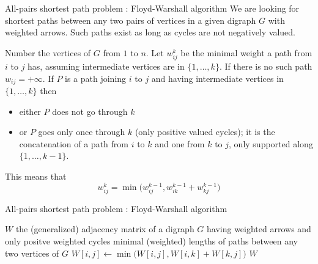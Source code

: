 \documentclass[32pt,aspectratio=169]{beamer}
\begin{document}
\begin{frame}{All-pairs shortest path problem : Floyd-Warshall algorithm}
  We are looking for shortest paths between any two pairs of vertices
  in a given digraph $G$ with weighted arrows. \alert{Such paths exist
    as long as cycles are not negatively valued}.

  \vspace{.5\baselineskip}

  Number the vertices of $G$ from $1$ to $n$. Let $w_{ij}^k$
  be the minimal weight a path from $i$ to $j$ has, assuming
  intermediate vertices are in $\{1, \ldots, k\}$. If there is no such
  path $w_{ij} = +\infty$. If $P$ is a path joining $i$ to $j$ and having
  intermediate vertices in $\{1, \ldots, k \}$ then
  \begin{itemize}
  \item either $P$ does not go through $k$
  \item or $P$ goes only once through $k$ (only positive valued cycles);
    it is the concatenation of a path from $i$ to $k$ and one from $k$
    to $j$, only supported along $\{ 1, \ldots, k-1\}$.
  \end{itemize}
  This means that
  \begin{displaymath}
    w_{ij}^k = \min\Big( w_{ij}^{k-1}, w_{ik}^{k-1} + w_{kj}^{k-1} \Big)
  \end{displaymath}
\end{frame}

\begin{frame}{All-pairs shortest path problem : Floyd-Warshall algorithm}
    \small{
      \begin{algorithmic}[1]
       \Statex
       \Require $W$ the (generalized) adjacency matrix of a digraph $G$ having weighted arrows and only positve weighted cycles
       \Ensure minimal (weighted) lengths of paths between any two vertices of $G$
       \Statex
       \State $W[i,j] \gets \min\Big(W[i,j], W[i,k] + W[k,j]\Big)$
       \EndFor
       \EndFor
       \EndFor
       \State \Return $W$
     \end{algorithmic}
     }
\end{frame}
\end{document}

